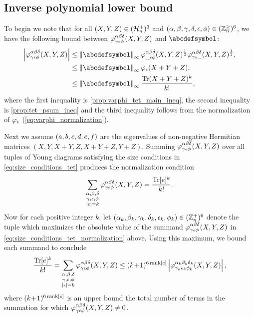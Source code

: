 \documentclass[notitlepage, 11pt, letterpaper]{amsart}
\begin{document}
\subsection{Inverse polynomial lower bound}
\label{sec:6j_inverse_poly}

To begin we note that for all $(X,Y,Z) \in (\mathcal H^{+}_{n})^{3}$ and $(\alpha,\beta,\gamma,\delta,\epsilon,\phi) \in (\mathbb Z^{\geq}_{n})^{6}$, we have the following bound between $\varphi^{\alpha\beta\delta}_{\gamma\epsilon\phi}(X,Y,Z)$ and $\abcdefsymbol$:
\begin{align}
    \label{eq:vp_tet_bound_sixj}
    \begin{split}
        \abs{\vp^{\ya\yb\yd}_{\yc\ye\yf}(X,Y,Z)} 
        &\leq \norm{\abcdefsymbol}_{\infty} \vp^{\ya\yb\yd}_{\_\ye\yf}(X,Y,Z)^{\frac{1}{2}} \vp^{\ya\yb\yd}_{\yc\ye\_}(X,Y,Z)^{\frac{1}{2}}, \\
        &\leq \norm{\abcdefsymbol}_{\infty} \varphi_{\ye}(X+Y+Z), \\
        &\leq \norm{\abcdefsymbol}_{\infty} \frac{\Tr(X+Y+Z)^k}{k!},
    \end{split}
\end{align}
where the first inequality is \cref{prop:varphi_tet_main_ineq}, the second inequality is \cref{prop:tet_psum_ineq} and the third inequality follows from the normalization of $\varphi_{\epsilon}$ (\cref{eq:varphi_normalization}).

Next we assume $(a,b,c,d,e,f)$ are the eigenvalues of non-negative Hermitian matrices $(X,Y,X+Y,Z,X+Y+Z,Y+Z)$.
Summing $\varphi^{\alpha\beta\delta}_{\gamma\epsilon\phi}(X,Y,Z)$ over all tuples of Young diagrams satisfying the size conditions in \cref{eq:size_conditions_tet} produces the normalization condition
\begin{equation}
    \label{eq:size_conditions_tet_normalization}
    \sum_{\substack{\alpha,\beta,\delta \\ \gamma,\epsilon,\phi \\ |\epsilon| = k}} \varphi^{\alpha\beta\delta}_{\gamma\epsilon\phi}(X,Y,Z) = \frac{\operatorname{Tr}[e]^k}{k!}.
\end{equation}
Now for each positive integer $k$, let $(\alpha_k,\beta_k,\gamma_k,\delta_k,\epsilon_k,\phi_k) \in (\mathbb Z^{+}_{n})^{6}$ denote the tuple which maximizes the absolute value of the summand $\varphi^{\alpha\beta\delta}_{\gamma\epsilon\phi}(X,Y,Z)$ in \cref{eq:size_conditions_tet_normalization} above.
Using this maximum, we bound each summand to conclude
\begin{equation}
    \label{eq:inverse_poly_varphi_lower}
    \frac{\operatorname{Tr}[e]^k}{k!} 
    = \sum_{\substack{\alpha,\beta,\delta \\ \gamma,\epsilon,\phi \\ |\epsilon| = k}} \varphi^{\alpha\beta\delta}_{\gamma\epsilon\phi}(X,Y,Z) 
    \leq (k\!+\!1)^{6\operatorname{rank}[e]} \left|\varphi^{\alpha_k\beta_k\delta_k}_{\gamma_k\epsilon_k\phi_k}(X,Y,Z)\right|,
\end{equation}
where $(k\!+\!1)^{6\operatorname{rank}[e]}$ is an upper bound the total number of terms in the summation for which $\varphi^{\alpha\beta\delta}_{\gamma\epsilon\phi}(X,Y,Z) \neq 0$.
\end{document}
